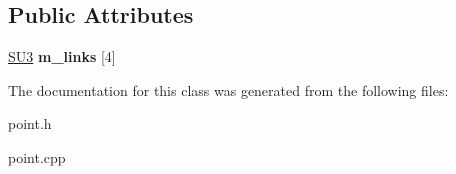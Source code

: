\subsection*{Public Attributes}
\begin{DoxyCompactItemize}
\item 
\hyperlink{structSU3}{S\+U3} {\bfseries m\+\_\+links} \mbox{[}4\mbox{]}\hypertarget{classPoint_a9b2d9b03add6fedff7e4e9369c6871b9}{}\label{classPoint_a9b2d9b03add6fedff7e4e9369c6871b9}

\end{DoxyCompactItemize}


The documentation for this class was generated from the following files\+:\begin{DoxyCompactItemize}
\item 
point.\+h\item 
point.\+cpp\end{DoxyCompactItemize}
